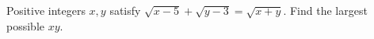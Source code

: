 Positive integers $x,y$ satisfy $\sqrt{x-5}+\sqrt{y-3}=\sqrt{x+y}$. Find the largest possible $xy$.

